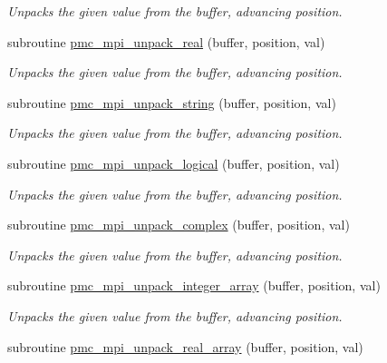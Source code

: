 \begin{DoxyCompactItemize}
\begin{DoxyCompactList}\small\item\em Unpacks the given value from the buffer, advancing position. \end{DoxyCompactList}\item 
subroutine \mbox{\hyperlink{namespacepmc__mpi_ab35288d7d6b96560d20b4279fe3d5d24}{pmc\+\_\+mpi\+\_\+unpack\+\_\+real}} (buffer, position, val)
\begin{DoxyCompactList}\small\item\em Unpacks the given value from the buffer, advancing position. \end{DoxyCompactList}\item 
subroutine \mbox{\hyperlink{namespacepmc__mpi_a9f7e3c5b0f7f68b520e13d980c9ad29c}{pmc\+\_\+mpi\+\_\+unpack\+\_\+string}} (buffer, position, val)
\begin{DoxyCompactList}\small\item\em Unpacks the given value from the buffer, advancing position. \end{DoxyCompactList}\item 
subroutine \mbox{\hyperlink{namespacepmc__mpi_a888a1c5675835da110e153fbacebb415}{pmc\+\_\+mpi\+\_\+unpack\+\_\+logical}} (buffer, position, val)
\begin{DoxyCompactList}\small\item\em Unpacks the given value from the buffer, advancing position. \end{DoxyCompactList}\item 
subroutine \mbox{\hyperlink{namespacepmc__mpi_adf7ed9374c30934fce2f30add1b2f703}{pmc\+\_\+mpi\+\_\+unpack\+\_\+complex}} (buffer, position, val)
\begin{DoxyCompactList}\small\item\em Unpacks the given value from the buffer, advancing position. \end{DoxyCompactList}\item 
subroutine \mbox{\hyperlink{namespacepmc__mpi_ad83634463577bdcc4454e393c77e5b04}{pmc\+\_\+mpi\+\_\+unpack\+\_\+integer\+\_\+array}} (buffer, position, val)
\begin{DoxyCompactList}\small\item\em Unpacks the given value from the buffer, advancing position. \end{DoxyCompactList}\item 
subroutine \mbox{\hyperlink{namespacepmc__mpi_a74007afa0767105d3817670040bb9641}{pmc\+\_\+mpi\+\_\+unpack\+\_\+real\+\_\+array}} (buffer, position, val)

\end{DoxyCompactItemize}
